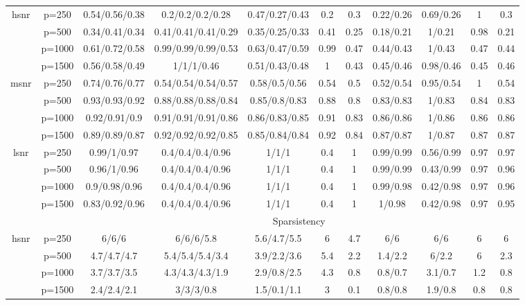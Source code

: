 \begin{table}[ht]
{\begin{tabular}{|c|c|ccccccccc|}
\midrule\multirow{4}[2]{*}{hsnr} & p=250 & 0.54/0.56/0.38 & 0.2/0.2/0.2/0.28 & 0.47/0.27/0.43 & 0.2 & 0.3 & 0.22/0.26 & 0.69/0.26 & 1 & 0.3 \\ 
   & p=500 & 0.34/0.41/0.34 & 0.41/0.41/0.41/0.29 & 0.35/0.25/0.33 & 0.41 & 0.25 & 0.18/0.21 & 1/0.21 & 0.98 & 0.21 \\ 
   & p=1000 & 0.61/0.72/0.58 & 0.99/0.99/0.99/0.53 & 0.63/0.47/0.59 & 0.99 & 0.47 & 0.44/0.43 & 1/0.43 & 0.47 & 0.44 \\ 
   & p=1500 & 0.56/0.58/0.49 & 1/1/1/0.46 & 0.51/0.43/0.48 & 1 & 0.43 & 0.45/0.46 & 0.98/0.46 & 0.45 & 0.46 \\ 
  \midrule\multirow{4}[2]{*}{msnr} & p=250 & 0.74/0.76/0.77 & 0.54/0.54/0.54/0.57 & 0.58/0.5/0.56 & 0.54 & 0.5 & 0.52/0.54 & 0.95/0.54 & 1 & 0.54 \\ 
   & p=500 & 0.93/0.93/0.92 & 0.88/0.88/0.88/0.84 & 0.85/0.8/0.83 & 0.88 & 0.8 & 0.83/0.83 & 1/0.83 & 0.84 & 0.83 \\ 
   & p=1000 & 0.92/0.91/0.9 & 0.91/0.91/0.91/0.86 & 0.86/0.83/0.85 & 0.91 & 0.83 & 0.86/0.86 & 1/0.86 & 0.86 & 0.86 \\ 
   & p=1500 & 0.89/0.89/0.87 & 0.92/0.92/0.92/0.85 & 0.85/0.84/0.84 & 0.92 & 0.84 & 0.87/0.87 & 1/0.87 & 0.87 & 0.87 \\ 
  \midrule\multirow{4}[2]{*}{lsnr} & p=250 & 0.99/1/0.97 & 0.4/0.4/0.4/0.96 & 1/1/1 & 0.4 & 1 & 0.99/0.99 & 0.56/0.99 & 0.97 & 0.97 \\ 
   & p=500 & 0.96/1/0.96 & 0.4/0.4/0.4/0.96 & 1/1/1 & 0.4 & 1 & 0.99/0.99 & 0.43/0.99 & 0.97 & 0.96 \\ 
   & p=1000 & 0.9/0.98/0.96 & 0.4/0.4/0.4/0.96 & 1/1/1 & 0.4 & 1 & 0.99/0.98 & 0.42/0.98 & 0.97 & 0.96 \\ 
   & p=1500 & 0.83/0.92/0.96 & 0.4/0.4/0.4/0.96 & 1/1/1 & 0.4 & 1 & 1/0.98 & 0.42/0.98 & 0.97 & 0.95 \\ 
   \midrule 
 \multicolumn{1}{|c}{} &       & \multicolumn{9}{c|}{Sparsistency} \\
\midrule\multirow{4}[2]{*}{hsnr} & p=250 & 6/6/6 & 6/6/6/5.8 & 5.6/4.7/5.5 & 6 & 4.7 & 6/6 & 6/6 & 6 & 6 \\ 
   & p=500 & 4.7/4.7/4.7 & 5.4/5.4/5.4/3.4 & 3.9/2.2/3.6 & 5.4 & 2.2 & 1.4/2.2 & 6/2.2 & 6 & 2.3 \\ 
   & p=1000 & 3.7/3.7/3.5 & 4.3/4.3/4.3/1.9 & 2.9/0.8/2.5 & 4.3 & 0.8 & 0.8/0.7 & 3.1/0.7 & 1.2 & 0.8 \\ 
   & p=1500 & 2.4/2.4/2.1 & 3/3/3/0.8 & 1.5/0.1/1.1 & 3 & 0.1 & 0.8/0.8 & 1.9/0.8 & 0.8 & 0.8 \\ 

\end{tabular}}
\end{table}
